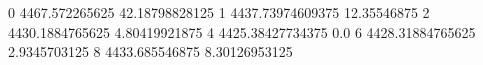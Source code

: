 0 4467.572265625 42.18798828125
1 4437.73974609375 12.35546875
2 4430.1884765625 4.80419921875
4 4425.38427734375 0.0
6 4428.31884765625 2.9345703125
8 4433.685546875 8.30126953125
